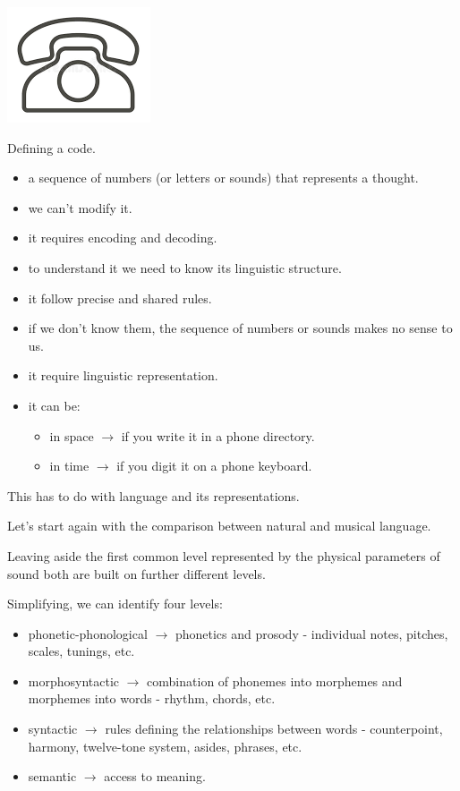 \begin{center}
\includegraphics[scale=0.4]{../img/telefono.png}
\end{center}

Defining a code.

\begin{itemize}
\tightlist
\item a sequence of numbers (or letters or sounds) that represents a thought.
\item we can't modify it.
\item it requires encoding and decoding.
\item to understand it we need to know its linguistic structure.
\item it follow precise and shared rules.
\item if we don't know them, the sequence of numbers or sounds makes no sense to us.
\item it require linguistic representation.
\item it can be: 
  \begin{itemize}
  \tightlist
  \item in space \(\rightarrow\) if you write it in a phone directory.
  \item in time \(\rightarrow\) if you digit it on a phone keyboard.
  \end{itemize}
\end{itemize}

This has to do with language and its representations.

Let's start again with the comparison between natural and musical language.

Leaving aside the first common level represented by the physical parameters of sound both are built on further different levels.

Simplifying, we can identify four levels:

\begin{itemize}
\tightlist
\item phonetic-phonological \(\rightarrow\) phonetics and prosody - individual notes, pitches, scales, tunings, etc.
\item morphosyntactic \(\rightarrow\) combination of phonemes into morphemes and morphemes into words - rhythm, chords, etc.
\item syntactic \(\rightarrow\) rules defining the relationships between words - counterpoint, harmony, twelve-tone system, asides, phrases, etc.
\item semantic \(\rightarrow\) access to meaning.
\end{itemize}


